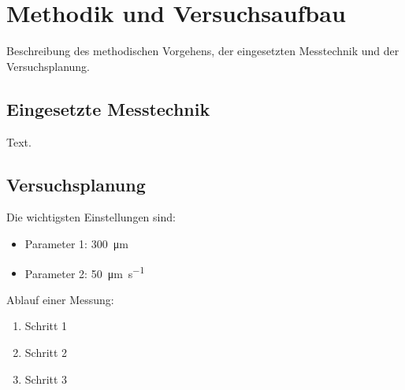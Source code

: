 \section{Methodik und Versuchsaufbau}
\label{cap:methodik}

Beschreibung des methodischen Vorgehens, der eingesetzten Messtechnik und der Versuchsplanung.

\subsection{Eingesetzte Messtechnik}
\label{cap:messtechnik}

Text.

\subsection{Versuchsplanung}
\label{cap:versuchsplanung}

Die wichtigsten Einstellungen sind:
\begin{itemize}
	\item Parameter 1: \SI{300}{\micro\metre}
	\item Parameter 2: \SI{50}{\micro\metre\per\second}
\end{itemize}

Ablauf einer Messung:
\begin{enumerate}[itemsep=0pt]
	\item Schritt 1
	\item Schritt 2
	\item Schritt 3
\end{enumerate}

